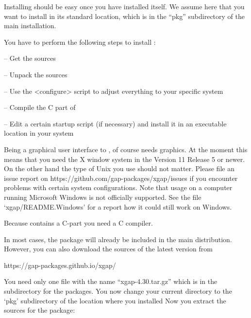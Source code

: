 
Installing {\XGAP} should be easy once you have installed {\GAP} itself. We
assume here that you want to install {\XGAP} in its standard location,
which is in the ``pkg'' subdirectory of the main {} installation.


You have to perform the following steps to install {\XGAP}:

\beginlist
\item{--} Get the sources
\item{--} Unpack the sources
\item{--} Use the <configure> script to adjust everything to your specific
  system
\item{--} Compile the C part of {\XGAP}
\item{--} Edit a certain startup script (if necessary) and install it in 
      an executable location in your system
\endlist


Being a graphical user interface to {\GAP}, {\XGAP} of course needs
graphics. At the moment this means that you need the X window system in the 
Version 11 Release 5 or newer. On the other hand the type of Unix you use 
should not matter. Please file an issue report on
\begintt
https://github.com/gap-packages/xgap/issues
\endtt
if you encounter problems with certain system configurations.
Note that usage on 
a computer running Microsoft Windows is not officially supported. 
See the file `xgap/README.Windows' for a report how it could
still work on Windows. 

Because {\XGAP} contains a C-part you need a C compiler.


In most cases, the {\XGAP} package will already be included in the main
distribution. However, you can also download the sources of the latest
version from

\begintt
https://gap-packages.github.io/xgap/
\endtt

You need only one file with the name ``xgap-4.30.tar.gz''
which is in the subdirectory for the packages.
You now change your current directory to the `pkg' subdirectory of the 
location where you installed
{\GAP}
Now you extract the sources for the {\XGAP} package:

